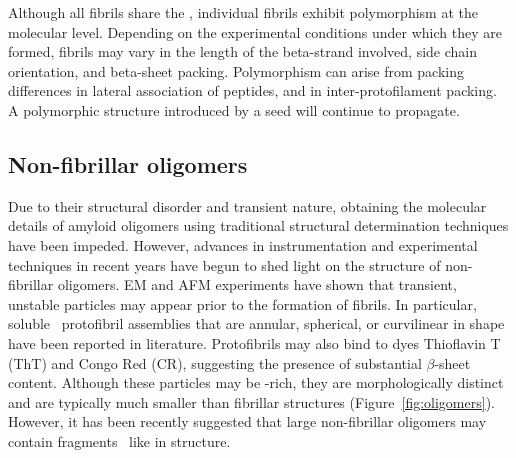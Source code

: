 Although all fibrils share the \crossbs, individual fibrils exhibit polymorphism at the molecular level. Depending on the experimental conditions under which they are formed, fibrils may vary in the length of the beta-strand involved, side chain orientation, and beta-sheet packing.\cite{Kodali:2007cz}
Polymorphism can arise from packing differences in lateral association of peptides, and in inter-protofilament packing. A polymorphic structure introduced by a seed will continue to propagate.\cite{some new papers,petkova polymorphism in Abeta} %


\subsection{Non-fibrillar oligomers}

Due to their structural disorder and transient nature, obtaining the molecular details of amyloid oligomers using traditional structural determination techniques have been impeded. However, advances in instrumentation and experimental techniques in recent years have begun to shed light on the structure of non-fibrillar oligomers. EM and AFM experiments have shown that transient, unstable particles may appear prior to the formation of fibrils. In particular, soluble \abeta\ protofibril assemblies that are annular, spherical, or curvilinear in shape have been reported in literature.\cite{Haass:2007db} Protofibrils may also bind to dyes Thioflavin T (ThT) and Congo Red (CR), suggesting the presence of substantial $\beta$-sheet content.\cite{Walsh:2007fu,Haass:2007db,Kodali:2007cz} Although these particles may be \bsheet-rich, they are morphologically distinct and are typically much smaller than fibrillar structures (Figure~\ref{fig:oligomers}).\cite{Walsh:2009p1235} However, it has been recently suggested that large non-fibrillar oligomers may contain fragments \crossb\ like in structure.\cite{Walsh:2010p4761,Stroud:2012dp,Chimon:2007du}  


